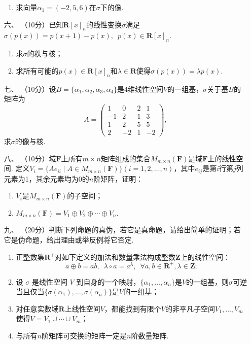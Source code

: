 \begin{enumerate}
\begin{enumerate}[label=(\arabic*)]
        \item 求向量$\alpha_1=(-2,5,6)$在$\sigma$下的像.
    \end{enumerate}
	\item[六、] （10分）已知$\mathbf{R}[x]_n$的线性变换$\sigma$满足$\sigma(p(x))=p(x+1)-p(x),\enspace p(x)\in\mathbf{R}[x]_n$.
	\begin{enumerate}[label=(\arabic*)]
        \item 求$\sigma$的秩与核；

        \item 求所有可能的$p(x)\in\mathbf{R}[x]_n$和$\lambda\in\mathbf{R}$使得$\sigma(p(x))=\lambda p(x)$.
    \end{enumerate}
	\item[七、]（10分）设$B=\{\alpha_1,\alpha_2,\alpha_3,\alpha_4\}$是4维线性空间$V$的一组基，$\sigma$关于基$B$的矩阵为
    \[A=\begin{pmatrix}1 & 0 & 2 & 1 \\ -1 & 2 & 1 & 3 \\ 1 & 2 & 5 & 5 \\ 2 & -2 & 1 & -2\end{pmatrix},\]
    求$\sigma$的像与核.

    \item[八、]（10分）域$\mathbf{F}$上所有$m\times n$矩阵组成的集合$M_{m\times n}(\mathbf{F})$是域$\mathbf{F}$上的线性空间. 定义$V_i=\{Ae_{ii}\mid A\in M_{m\times n}(\mathbf{F})\}(i=1,2,\ldots,n)$，其中$e_{ij}$是第$i$行第$j$列元素为1，其余元素均为0的$n$阶矩阵，证明：
    \begin{enumerate}[label=(\arabic*)]
        \item $V_i$是$M_{m\times n}(\mathbf{F})$的子空间；

        \item $M_{m\times n}(\mathbf{F})=V_1\oplus V_2\oplus\cdots\oplus V_n$.
    \end{enumerate}
	\item[九、]（20分）判断下列命题的真伪，若它是真命题，请给出简单的证明；若它是伪命题，给出理由或举反例将它否定.
    \begin{enumerate}[label=(\arabic*)]
        \item 正整数集$\mathbf{R}^+$对如下定义的加法和数量乘法构成整数$\mathbf{Z}$上的线性空间：
        \[a\oplus b=ab,\enspace\lambda\circ a=a^\lambda,\enspace\forall a,b\in\mathbf{R}^+,\lambda\in\mathbf{Z};\]

        \item 设 $\sigma$ 是线性空间 $V$ 到自身的一个映射，$\{\alpha_1,\ldots,\alpha_n\}$是$V$的一组基，则$\sigma$可逆当且仅当$\{\sigma(\alpha_1),\ldots,\sigma(\alpha_n)\}$是$V$的一组基；

        \item 对任意实数域$\mathbf{R}$上线性空间$V$，都能找到有限个$V$的非平凡子空间$V_1,\ldots,V_m$使得$V = V_1\cup\cdots\cup V_m$；

        \item 与所有$n$阶矩阵可交换的矩阵一定是$n$阶数量矩阵.
    \end{enumerate}
\end{enumerate}

\clearpage

